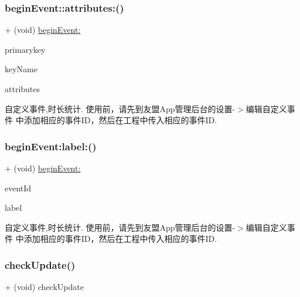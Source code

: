 \subsubsection{\texorpdfstring{begin\+Event\+::attributes\+:()}{beginEvent::attributes:()}}
{\footnotesize\ttfamily + (void) \hyperlink{interfaceMobClick_adba75e0a140ccb8c895df344e4a8bdbc}{begin\+Event\+:} \begin{DoxyParamCaption}\item[{(N\+S\+String $\ast$)}]{primarykey }\item[{:(N\+S\+String $\ast$)}]{key\+Name }\item[{attributes:(N\+S\+Dictionary $\ast$)}]{attributes }\end{DoxyParamCaption}}

自定义事件,时长统计. 使用前，请先到友盟\+App管理后台的设置-\/$>$编辑自定义事件 中添加相应的事件\+I\+D，然后在工程中传入相应的事件\+ID. \mbox{\label{interfaceMobClick_a7e22315d3d309120861bc8cff05d619d}} 
\subsubsection{\texorpdfstring{begin\+Event\+:label\+:()}{beginEvent:label:()}}
{\footnotesize\ttfamily + (void) \hyperlink{interfaceMobClick_adba75e0a140ccb8c895df344e4a8bdbc}{begin\+Event\+:} \begin{DoxyParamCaption}\item[{(N\+S\+String $\ast$)}]{event\+Id }\item[{label:(N\+S\+String $\ast$)}]{label }\end{DoxyParamCaption}}

自定义事件,时长统计. 使用前，请先到友盟\+App管理后台的设置-\/$>$编辑自定义事件 中添加相应的事件\+I\+D，然后在工程中传入相应的事件\+ID. \mbox{\label{interfaceMobClick_af449f6d1578c8c8c81b0b766c30f7589}} 
\subsubsection{\texorpdfstring{check\+Update()}{checkUpdate()}}
{\footnotesize\ttfamily + (void) check\+Update \begin{DoxyParamCaption}{ }\end{DoxyParamCaption}}

